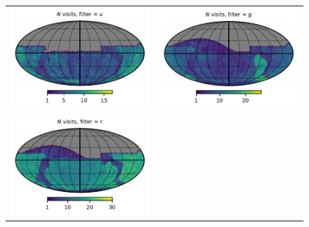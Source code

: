 \documentclass[preprintm,linenumbers]{aastex631}
\begin{document}
	\begin{figure}
		\centering
		\begin{tabular}{@{}c@{}c@{}}
			\includegraphics{results/skymaps/skymap_first_year_one_snap_v4_0_10yrs_db_noDD_noTwi_nside-256_CountMetric_u_noDD_noTwi.pdf} &
			\includegraphics{results/skymaps/skymap_first_year_one_snap_v4_0_10yrs_db_noDD_noTwi_nside-256_CountMetric_g_noDD_noTwi.pdf} \\
			\includegraphics{results/skymaps/skymap_first_year_one_snap_v4_0_10yrs_db_noDD_noTwi_nside-256_CountMetric_r_noDD_noTwi.pdf} &

\end{tabular}
\end{figure}
\end{document}
